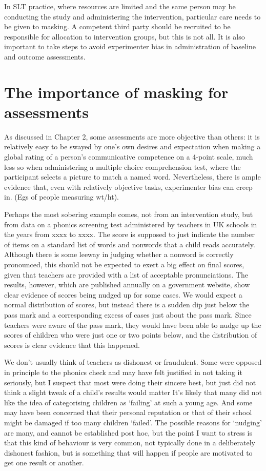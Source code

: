 \documentclass[]{book}
\begin{document}
In SLT practice, where resources are limited and the same person may be conducting the study and administering the intervention, particular care needs to be given to masking. A competent third party should be recruited to be responsible for allocation to intervention groups, but this is not all. It is also important to take steps to avoid experimenter bias in administration of baseline and outcome assessments.

\hypertarget{the-importance-of-masking-for-assessments}{%
\section{The importance of masking for assessments}\label{the-importance-of-masking-for-assessments}}

As discussed in Chapter 2, some assessments are more objective than others: it is relatively easy to be swayed by one's own desires and expectation when making a global rating of a person's communicative competence on a 4-point scale, much less so when administering a multiple choice comprehension test, where the participant selects a picture to match a named word. Nevertheless, there is ample evidence that, even with relatively objective tasks, experimenter bias can creep in. (Egs of people measuring wt/ht).

Perhaps the most sobering example comes, not from an intervention study, but from data on a phonics screening test administered by teachers in UK schools in the years from xxxx to xxxx. The score is supposed to just indicate the number of items on a standard list of words and nonwords that a child reads accurately. Although there is some leeway in judging whether a nonword is correctly pronounced, this should not be expected to exert a big effect on final scores, given that teachers are provided with a list of acceptable pronunciations. The results, however, which are published annually on a government website, show clear evidence of scores being nudged up for some cases. We would expect a normal distribution of scores, but instead there is a sudden dip just below the pass mark and a corresponding excess of cases just about the pass mark. Since teachers were aware of the pass mark, they would have been able to nudge up the scores of children who were just one or two points below, and the distribution of scores is clear evidence that this happened.

We don't usually think of teachers as dishonest or fraudulent. Some were opposed in principle to the phonics check and may have felt justified in not taking it seriously, but I suspect that most were doing their sincere best, but just did not think a slight tweak of a child's results would matter It's likely that many did not like the idea of categorising children as `failing' at such a young age. And some may have been concerned that their personal reputation or that of their school might be damaged if too many children `failed'. The possible reasons for `nudging' are many, and cannot be established post hoc, but the point I want to stress is that this kind of behaviour is very common, not typically done in a deliberately dishonest fashion, but is something that will happen if people are motivated to get one result or another.
\end{document}
